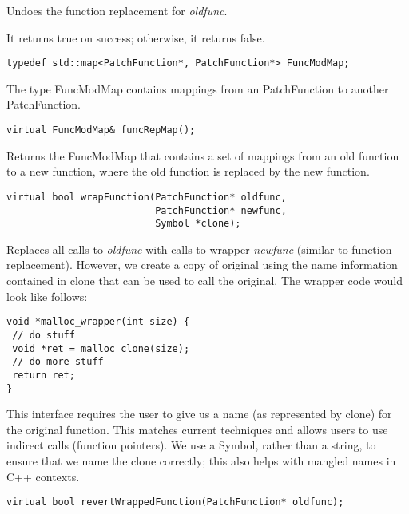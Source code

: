 Undoes the function replacement for \emph{oldfunc}.

It returns true on success; otherwise, it returns false.


\begin{verbatim}
typedef std::map<PatchFunction*, PatchFunction*> FuncModMap;

\end{verbatim}



The type FuncModMap contains mappings from an PatchFunction to another
PatchFunction.


\begin{verbatim}
virtual FuncModMap& funcRepMap();

\end{verbatim}



Returns the FuncModMap that contains a set of mappings from an old function to a
new function, where the old function is replaced by the new function.


\begin{verbatim}
virtual bool wrapFunction(PatchFunction* oldfunc,
                          PatchFunction* newfunc,
                          Symbol *clone);

\end{verbatim}



Replaces all calls to \emph{oldfunc} with calls to wrapper \emph{newfunc} (similar to
function replacement). However, we create a copy of original using the name
information contained in clone that can be used to call the original. The
wrapper code would look like follows:


\begin{verbatim}
void *malloc_wrapper(int size) {
 // do stuff
 void *ret = malloc_clone(size);
 // do more stuff
 return ret;
}

\end{verbatim}



This interface requires the user to give us a name (as represented by clone) for
the original function. This matches current techniques and allows users to use
indirect calls (function pointers). We use a Symbol, rather than a string, to
ensure that we name the clone correctly; this also helps with mangled names in
C++ contexts.


\begin{verbatim}
virtual bool revertWrappedFunction(PatchFunction* oldfunc);

\end{verbatim}



